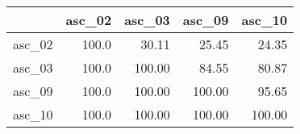 \begin{tabular}{lrrrr}
\toprule
{} &  asc\_02 &  asc\_03 &  asc\_09 &  asc\_10 \\
\midrule
asc\_02 &   100.0 &   30.11 &   25.45 &   24.35 \\
asc\_03 &   100.0 &  100.00 &   84.55 &   80.87 \\
asc\_09 &   100.0 &  100.00 &  100.00 &   95.65 \\
asc\_10 &   100.0 &  100.00 &  100.00 &  100.00 \\
\bottomrule
\end{tabular}

